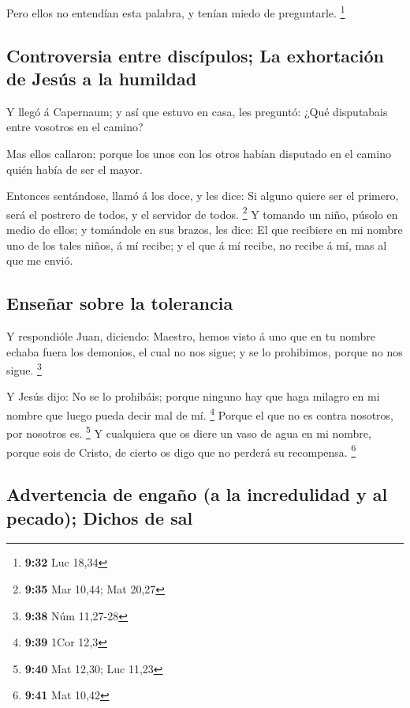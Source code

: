  Pero ellos no entendían esta palabra, y tenían miedo de
preguntarle. \footnote{\textbf{9:32} Luc 18,34}

\hypertarget{controversia-entre-discuxedpulos-la-exhortaciuxf3n-de-jesuxfas-a-la-humildad}{%
\subsection{Controversia entre discípulos; La exhortación de Jesús a la
humildad}\label{controversia-entre-discuxedpulos-la-exhortaciuxf3n-de-jesuxfas-a-la-humildad}}

 Y llegó á Capernaum; y así que estuvo en casa, les
preguntó: ¿Qué disputabais entre vosotros en el camino?

 Mas ellos callaron; porque los unos con los otros habían
disputado en el camino quién había de ser el mayor.

 Entonces sentándose, llamó á los doce, y les dice: Si
alguno quiere ser el primero, será el postrero de todos, y el servidor
de todos. \footnote{\textbf{9:35} Mar 10,44; Mat 20,27}  Y
tomando un niño, púsolo en medio de ellos; y tomándole en sus brazos,
les dice:  El que recibiere en mi nombre uno de los tales
niños, á mí recibe; y el que á mí recibe, no recibe á mí, mas al que me
envió.

\hypertarget{enseuxf1ar-sobre-la-tolerancia}{%
\subsection{Enseñar sobre la
tolerancia}\label{enseuxf1ar-sobre-la-tolerancia}}

 Y respondióle Juan, diciendo: Maestro, hemos visto á uno
que en tu nombre echaba fuera los demonios, el cual no nos sigue; y se
lo prohibimos, porque no nos sigue. \footnote{\textbf{9:38} Núm 11,27-28}

 Y Jesús dijo: No se lo prohibáis; porque ninguno hay que
haga milagro en mi nombre que luego pueda decir mal de mí. \footnote{\textbf{9:39}
  1Cor 12,3}  Porque el que no es contra nosotros, por
nosotros es. \footnote{\textbf{9:40} Mat 12,30; Luc 11,23} 
Y cualquiera que os diere un vaso de agua en mi nombre, porque sois de
Cristo, de cierto os digo que no perderá su recompensa. \footnote{\textbf{9:41}
  Mat 10,42}

\hypertarget{advertencia-de-engauxf1o-a-la-incredulidad-y-al-pecado-dichos-de-sal}{%
\subsection{Advertencia de engaño (a la incredulidad y al pecado);
Dichos de
sal}\label{advertencia-de-engauxf1o-a-la-incredulidad-y-al-pecado-dichos-de-sal}}

